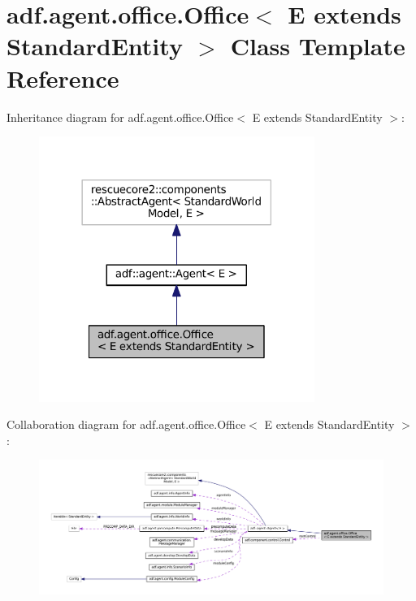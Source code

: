 \hypertarget{classadf_1_1agent_1_1office_1_1Office}{}\section{adf.\+agent.\+office.\+Office$<$ E extends Standard\+Entity $>$ Class Template Reference}
\label{classadf_1_1agent_1_1office_1_1Office}


Inheritance diagram for adf.\+agent.\+office.\+Office$<$ E extends Standard\+Entity $>$\+:
\nopagebreak
\begin{figure}[H]
\begin{center}
\leavevmode
\includegraphics[width=254pt]{classadf_1_1agent_1_1office_1_1Office__inherit__graph}
\end{center}
\end{figure}


Collaboration diagram for adf.\+agent.\+office.\+Office$<$ E extends Standard\+Entity $>$\+:
\nopagebreak
\begin{figure}[H]
\begin{center}
\leavevmode
\includegraphics[width=350pt]{classadf_1_1agent_1_1office_1_1Office__coll__graph}
\end{center}
\end{figure}
